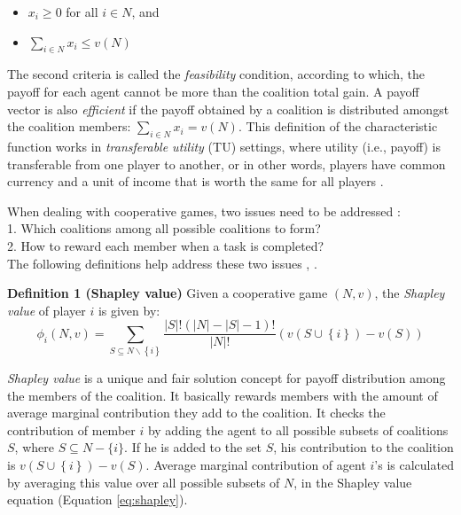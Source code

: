 \documentclass[10pt,journal,cspaper,compsoc]{IEEEtran}
\begin{document}
\begin{itemize}
    \item $x_i \geq 0$ for all $i \in N$, and
    \item $\sum_{i \in N} x_i \leq v(N)$
\end{itemize}


The second criteria is called the \emph{feasibility} condition,
according to which, the payoff for each agent cannot be more than
the coalition total gain. A payoff vector is also \emph{efficient}
if the payoff obtained by a coalition is distributed amongst the
coalition members: $\sum_{i \in N} x_i = v(N)$. This definition of
the characteristic function works in \emph{transferable utility}
(TU) settings, where utility (i.e., payoff) is transferable from
one player to another, or in other words, players have common
currency and a unit of income that is worth the same for all
players \cite{myerson1991game}.


When dealing with cooperative games, two issues need to be
addressed  \cite{
DBLP:conf/ijcai/GrecoMPS11,Sandholm1999209,DBLP:conf/ijcai/RahwanMJ11}:\\ 1. Which coalitions among all possible coalitions to form? \\
2. How to reward each member when a task is completed?\\
%
The following definitions help address these two issues
\cite{shapley_value}, \cite{S1971cores}.


{\bf Definition 1 (Shapley value)} Given a cooperative game $(N,
v)$, the \emph{Shapley value} of player $i$ is given by:
\begin{equation}\label{eq:shapley}
\phi_i(N,v) = \sum_{S \subseteq N \backslash \left\{i\right\} }
\frac{|S|! (|N|-|S|-1)!}{|N|!} (v(S \cup \left\{i\right\}) - v(S))
\end{equation}


\emph{Shapley value} is a unique and fair solution concept for
payoff distribution among the members of the coalition. It
basically rewards members with the amount of average marginal
contribution they add to the coalition. It checks the contribution
of member $i$ by adding the agent to all possible subsets of
coalitions $S$, where $S \subseteq N-\{i\}$. If he is added to the
set $S$, his contribution to the coalition is $v(S \cup
\left\{i\right\}) - v(S)$. Average marginal contribution of agent
$i$'s is calculated by averaging this value over all possible
subsets of $N$, in the Shapley value equation (Equation
\ref{eq:shapley}).
\end{document}
